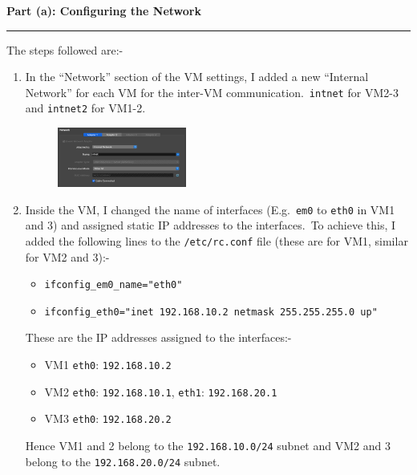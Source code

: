 \documentclass[a4paper,12pt]{article}
\newenvironment{solution}[2][]{%
\begin{mdframed}[linecolor=blue!70!black, linewidth=2pt, roundcorner=10pt, backgroundcolor=yellow!10!white, skipabove=12pt, skipbelow=12pt]%
	\textbf{\large #2}
	\par\noindent\rule{\textwidth}{0.4pt}
}{
\end{mdframed}
}
\begin{document}
\begin{solution}{Part (a): Configuring the Network}
    The steps followed are:-
    \begin{enumerate}
        \item In the ``Network'' section of the VM settings, I added a new ``Internal Network'' for each VM for the inter-VM communication.\ \texttt{intnet} for VM2-3 and \texttt{intnet2} for VM1-2.
        \begin{figure}[H]
            \centering
            \includegraphics[width=0.4\textwidth]{internal_network.png}
        \end{figure}
        \item Inside the VM, I changed the name of interfaces (E.g.\ \texttt{em0} to \texttt{eth0} in VM1 and 3) and assigned static IP addresses to the interfaces.\ To achieve this, I added the following lines to the \texttt{/etc/rc.conf} file (these are for VM1, similar for VM2 and 3):-
        \begin{itemize}
            \item \texttt{ifconfig\_em0\_name="eth0"}
            \item \texttt{ifconfig\_eth0="inet 192.168.10.2 netmask 255.255.255.0 up"}
        \end{itemize}
        These are the IP addresses assigned to the interfaces:-
        \begin{itemize}
            \item VM1 \texttt{eth0}: \texttt{192.168.10.2}
            \item VM2 \texttt{eth0}: \texttt{192.168.10.1}, \texttt{eth1}: \texttt{192.168.20.1}
            \item VM3 \texttt{eth0}: \texttt{192.168.20.2}
        \end{itemize}
        Hence VM1 and 2 belong to the \texttt{192.168.10.0/24} subnet and VM2 and 3 belong to the \texttt{192.168.20.0/24} subnet.
    \end{enumerate}
\end{solution}
\end{document}

